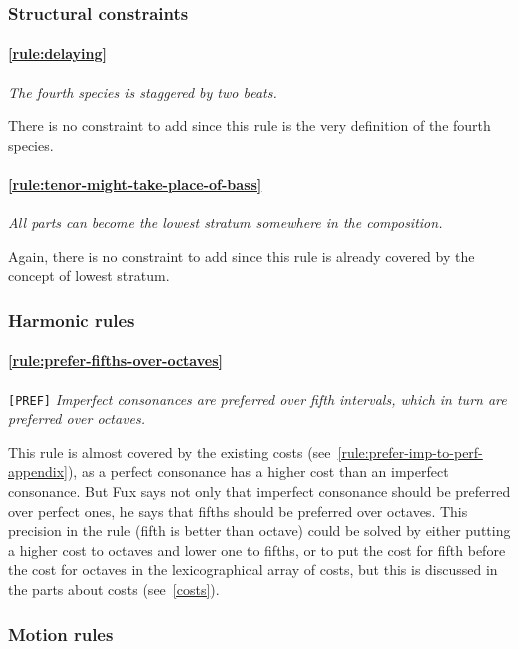 \subsubsection{Structural constraints}
    \paragraph{\hspace{.5cm}\ref{rule:delaying}} \textit{The fourth species is staggered by two beats.}

    There is no constraint to add since this rule is the very definition of the fourth species.

    \paragraph{\hspace{.5cm}\ref{rule:tenor-might-take-place-of-bass}} \textit{All parts can become the lowest stratum somewhere in the composition.} 
    
    Again, there is no constraint to add since this rule is already covered by the concept of lowest stratum.


\subsubsection{Harmonic rules}
\paragraph{\hspace{.6cm}\ref{rule:prefer-fifths-over-octaves}} \texttt{[PREF]} \textit{Imperfect consonances are preferred over fifth intervals, which in turn are preferred over octaves.}   

    This rule is almost covered by the existing costs (see~\ref{rule:prefer-imp-to-perf-appendix}), as a perfect consonance has a higher cost than an imperfect consonance. But Fux says not only that imperfect consonance should be preferred over perfect ones, he says that fifths should be preferred over octaves. This precision in the rule (fifth is better than octave) could be solved by either putting a higher cost to octaves and lower one to fifths, or to put the cost for fifth before the cost for octaves in the lexicographical array of costs, but this is discussed in the parts about costs (see~\ref{costs}).


\subsubsection{Motion rules}
